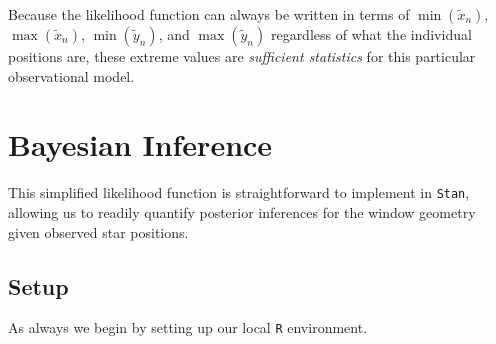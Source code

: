 \documentclass[
  letterpaper,
  DIV=11,
  numbers=noendperiod]{scrartcl}
\begin{document}
Because the likelihood function can always be written in terms of
\(\min(\tilde{x}_{n})\), \(\max(\tilde{x}_{n})\),
\(\min(\tilde{y}_{n})\), and \(\max(\tilde{y}_{n})\) regardless of what
the individual positions are, these extreme values are \emph{sufficient
statistics} for this particular observational model.

\section{Bayesian Inference}\label{bayesian-inference}

This simplified likelihood function is straightforward to implement in
\texttt{Stan}, allowing us to readily quantify posterior inferences for
the window geometry given observed star positions.

\subsection{Setup}\label{setup}

As always we begin by setting up our local \texttt{R} environment.
\end{document}
